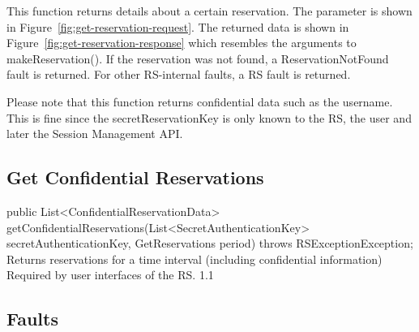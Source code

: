 \documentclass[a4paper,11pt]{article}
\begin{document}
This function returns details about a certain reservation. The parameter is shown in Figure~\ref{fig:get-reservation-request}. The returned data is shown in Figure~\ref{fig:get-reservation-response} which resembles the arguments to makeReservation(). If the reservation was not found, a ReservationNotFound fault is returned.  For other RS-internal faults, a RS fault is returned. 

Please note that this function returns confidential data such as the username. This is fine since the secretReservationKey is only known to the RS, the user and later the Session Management API. 


			\sectionfin
			\subsection{Get Confidential Reservations}

\begin{apidoc}
	{public List<ConfidentialReservationData> getConfidentialReservations(List<SecretAuthenticationKey> secretAuthenticationKey, GetReservations period) throws RSExceptionException;} %
	{Returns reservations for a time interval (including confidential information)} %
	{
	} %
	{} %
	{Required by user interfaces of the RS.} %
	{1.1} %
\end{apidoc}

	
	
			\sectionfin
			\subsection{Faults}
	
\end{document}
